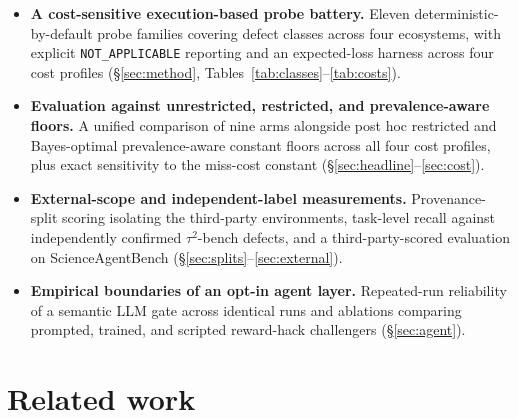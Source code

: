 \documentclass[11pt]{article}
\begin{document}
\begin{itemize}\setlength\itemsep{1pt}\setlength\parskip{0pt}
\item \textbf{A cost-sensitive execution-based probe battery.} Eleven deterministic-by-default probe
families covering \nClasses{} defect classes across four ecosystems, with explicit
\texttt{NOT\_APPLICABLE} reporting and an expected-loss harness across four cost profiles
(\S\ref{sec:method}, Tables~\ref{tab:classes}--\ref{tab:costs}).
\item \textbf{Evaluation against unrestricted, restricted, and prevalence-aware floors.} A unified
comparison of nine arms alongside post hoc restricted and Bayes-optimal prevalence-aware constant
floors across all four cost profiles, plus exact sensitivity to the miss-cost constant
(\S\ref{sec:headline}--\ref{sec:cost}).
\item \textbf{External-scope and independent-label measurements.} Provenance-split scoring isolating
the \nExternal{} third-party environments, task-level recall against \tauPos{} independently
confirmed $\tau^2$-bench defects, and a third-party-scored evaluation on ScienceAgentBench
(\S\ref{sec:splits}--\ref{sec:external}).
\item \textbf{Empirical boundaries of an opt-in agent layer.} Repeated-run reliability of a semantic
LLM gate across \gateRuns{} identical runs and ablations comparing prompted, trained, and scripted
reward-hack challengers (\S\ref{sec:agent}).
\end{itemize}

\section{Related work}
\label{sec:related}
\end{document}
